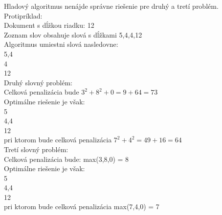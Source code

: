 \documentclass[paper=a4, fontsize=11pt]{scrartcl} %
\numberwithin{equation}{section} %
\numberwithin{figure}{section} %
\numberwithin{table}{section} %
\begin{document}
Hladový algoritmus nenájde správne riešenie pre druhý a tretí problém. \\
Protipríklad: \\
Dokument s dĺžkou riadku: 12 \\
Zoznam slov obsahuje slová s dĺžkami 5,4,4,12 \\

Algoritmus umiestni slová nasledovne: \\
5,4 \\
4 \\
12 \\

Druhý slovný problém: \\
Celková penalizácia bude $3^2 + 8^2 + 0 = 9 + 64 = 73$ \\

Optimálne riešenie je však: \\
5 \\
4,4 \\
12 \\
pri ktorom bude celková penalizácia $7^2 + 4^2 = 49 + 16 = 64$ \\

Tretí slovný problém: \\
Celková penalizácia bude: max(3,8,0) = 8 \\

Optimálne riešenie je však: \\
5 \\
4,4 \\
12 \\
pri ktorom bude celková penalizácia max(7,4,0) = 7 \\
\end{document}
